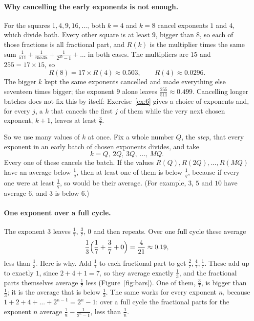 \documentclass[10pt]{article}
\theoremstyle{plain}
\theoremstyle{definition}
\theoremstyle{remark}
\begin{document}
\paragraph{Why cancelling the early exponents is not enough.} For the squares
$1,4,9,16,\dots$, both $k=4$ and $k=8$ cancel exponents $1$ and $4$, which
divide both. Every other square is at least $9$, bigger than $8$, so each of
those fractions is all fractional part, and $R(k)$ is the multiplier
times the same sum $\tfrac1{511}+\tfrac1{65535}+\tfrac1{2^{25}-1}+\dots$ in
both cases. The multipliers are $15$ and $255=17\times15$, so
\[
 R(8)=17\times R(4)\approx0.503,\qquad R(4)\approx0.0296 .
\]
The bigger $k$ kept the same exponents cancelled and made everything else
seventeen times bigger; the exponent $9$ alone leaves
$\tfrac{255}{511}\approx0.499$. Cancelling longer batches does not fix this
by itself: Exercise~\ref{ex:6} gives a choice of exponents and, for every
$j$, a $k$ that cancels the first $j$ of them while the very next chosen
exponent, $k+1$, leaves at least $\tfrac37$.

So we use many values of $k$ at once. Fix a whole number $Q$, the
\emph{step}, that every exponent in an early batch of chosen exponents
divides, and take
\[
 k=Q,\ 2Q,\ 3Q,\ \dots,\ MQ .
\]
Every one of these cancels the batch. If the values
$R(Q),R(2Q),\dots,R(MQ)$ have an average below $\tfrac1q$, then at least one
of them is below $\tfrac1q$, because if every one were at least $\tfrac1q$, so
would be their average. (For example, $3$, $5$ and $10$ have average $6$, and
$3$ is below $6$.)

\paragraph{One exponent over a full cycle.} The exponent $3$ leaves $\tfrac17$,
$\tfrac37$, $0$ and then repeats. Over one full cycle these average
\[
 \frac13\Bigl(\frac17+\frac37+0\Bigr)=\frac4{21}\approx0.19,
\]
less than $\tfrac13$. Here is why. Add $\tfrac17$ to each fractional part to get
$\tfrac27,\tfrac47,\tfrac17$. These add up to exactly $1$, since $2+4+1=7$, so
they average exactly $\tfrac13$, and the fractional parts themselves average
$\tfrac17$ less (Figure~\ref{fig:bars}). One of them, $\tfrac37$, is bigger than
$\tfrac13$; it is the average that is below $\tfrac13$. The same works for every
exponent $n$, because $1+2+4+\dots+2^{n-1}=2^n-1$: over a full cycle the
fractional parts for the exponent $n$ average $\tfrac1n-\tfrac1{2^n-1}$, less
than $\tfrac1n$.
\end{document}
